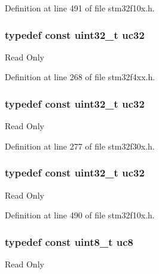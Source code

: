 Definition at line 491 of file stm32f10x.\-h.

\hypertarget{group___exported__types_ga5b628e6a05856ff67e535fa391a57683}{
\subsubsection[{uc32}]{\setlength{\rightskip}{0pt plus 5cm}typedef {\bf const} {\bf uint32\-\_\-t} {\bf uc32}}}\label{group___exported__types_ga5b628e6a05856ff67e535fa391a57683}
Read Only 

Definition at line 268 of file stm32f4xx.\-h.

\hypertarget{group___exported__types_ga5b628e6a05856ff67e535fa391a57683}{
\subsubsection[{uc32}]{\setlength{\rightskip}{0pt plus 5cm}typedef {\bf const} {\bf uint32\-\_\-t} {\bf uc32}}}\label{group___exported__types_ga5b628e6a05856ff67e535fa391a57683}
Read Only 

Definition at line 277 of file stm32f30x.\-h.

\hypertarget{group___exported__types_ga5b628e6a05856ff67e535fa391a57683}{
\subsubsection[{uc32}]{\setlength{\rightskip}{0pt plus 5cm}typedef {\bf const} {\bf uint32\-\_\-t} {\bf uc32}}}\label{group___exported__types_ga5b628e6a05856ff67e535fa391a57683}
Read Only 

Definition at line 490 of file stm32f10x.\-h.

\hypertarget{group___exported__types_gac74022c74a461f810e0d4fdc9bfea480}{
\subsubsection[{uc8}]{\setlength{\rightskip}{0pt plus 5cm}typedef {\bf const} {\bf uint8\-\_\-t} {\bf uc8}}}\label{group___exported__types_gac74022c74a461f810e0d4fdc9bfea480}
Read Only 

